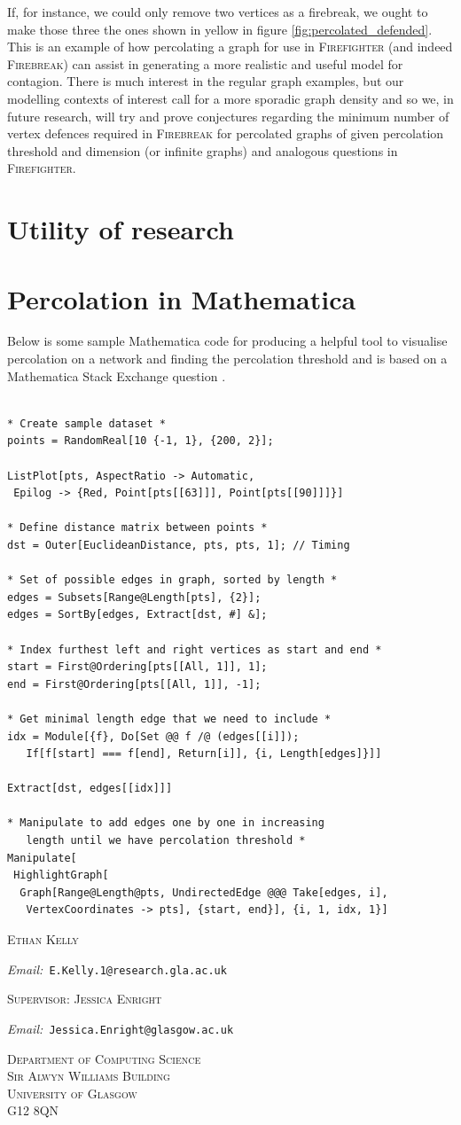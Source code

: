 \documentclass[11pt]{amsart}
\makeatletter
\newcommand{\Addresses}{{%
  \bigskip
  \footnotesize
  \textsc{Ethan Kelly} \par\nopagebreak
  	\hspace{\parindent}\textit{Email:~}\texttt{E.Kelly.1@research.gla.ac.uk}\par\nopagebreak
	\vspace{1mm}
  \textsc{Supervisor: Jessica Enright}\par\nopagebreak
  	\hspace{\parindent}\textit{Email:~}\texttt{Jessica.Enright@glasgow.ac.uk}\par\nopagebreak
	\vspace{1mm}
	\begin{flushright}
  \textsc{Department of Computing Science\\Sir Alwyn Williams Building\\University of Glasgow\\G12 8QN}
  \end{flushright}
}}
\makeatother
\begin{document}
If, for instance, we could only remove two vertices as a firebreak, we ought to make those three the ones shown in yellow in figure \ref{fig:percolated_defended}. This is an example of how percolating a graph for use in {\scshape Firefighter} (and indeed {\scshape Firebreak}) can assist in generating a more realistic and useful model for contagion. There is much interest in the regular graph examples, but our modelling contexts of interest call for a more sporadic graph density and so we, in future research, will try and prove conjectures regarding the minimum number of vertex defences required in {\scshape Firebreak} for percolated graphs of given percolation threshold and dimension (or infinite graphs) and analogous questions in {\scshape Firefighter}.

\section{Utility of research}




\appendix
\section{Percolation in Mathematica}
\label{apx:mathematica}
Below is some sample Mathematica code for producing a helpful tool to visualise percolation on a network and finding the percolation threshold and is based on a Mathematica Stack Exchange question \cite{mathematica17}.
\begin{verbatim}

* Create sample dataset *
points = RandomReal[10 {-1, 1}, {200, 2}];

ListPlot[pts, AspectRatio -> Automatic, 
 Epilog -> {Red, Point[pts[[63]]], Point[pts[[90]]]}]

* Define distance matrix between points *
dst = Outer[EuclideanDistance, pts, pts, 1]; // Timing

* Set of possible edges in graph, sorted by length *
edges = Subsets[Range@Length[pts], {2}];
edges = SortBy[edges, Extract[dst, #] &];

* Index furthest left and right vertices as start and end *
start = First@Ordering[pts[[All, 1]], 1];
end = First@Ordering[pts[[All, 1]], -1];

* Get minimal length edge that we need to include *
idx = Module[{f}, Do[Set @@ f /@ (edges[[i]]);
   If[f[start] === f[end], Return[i]], {i, Length[edges]}]]

Extract[dst, edges[[idx]]]

* Manipulate to add edges one by one in increasing
   length until we have percolation threshold *
Manipulate[
 HighlightGraph[
  Graph[Range@Length@pts, UndirectedEdge @@@ Take[edges, i], 
   VertexCoordinates -> pts], {start, end}], {i, 1, idx, 1}]

\end{verbatim}





\Addresses
\end{document}
